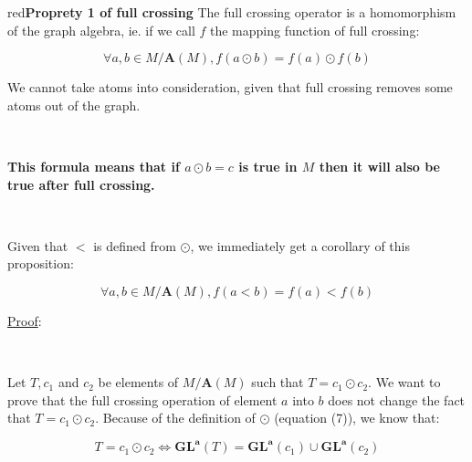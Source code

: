 \documentclass[a4paper, 11pt]{article}
\begin{document}
\begin{mybox}{red}{\textbf{Proprety 1 of full crossing}}
The full crossing operator is a homomorphism of the graph algebra, ie. if we call $f$ the mapping function of full crossing:

\begin{equation}
    \forall a,b \in M/\boldsymbol{A}(M), f(a \odot b) = f(a) \odot f(b) 
\end{equation}

We cannot take atoms into consideration, given that full crossing removes some atoms out of the graph.


\

\textbf{This formula means that if $a \odot b = c$ is true in $M$ then it will also be true after full crossing.}

\

Given that $<$ is defined from $\odot$, we immediately get a corollary of this proposition:

\begin{equation}
    \forall a,b \in M/\boldsymbol{A}(M), f(a < b) = f(a) < f(b) 
\end{equation}


\end{mybox}

\noindent
\underline{Proof}:

\

Let $T, c_1$ and $c_2$ be elements of $M/\boldsymbol{A}(M)$ such that $T = c_1 \odot c_2$. We want to prove that the full crossing operation of element $a$ into $b$ does not change the fact that $T = c_1 \odot c_2$. Because of the definition of $\odot$ (equation (7)), we know that:

\begin{equation*}
    T = c_1 \odot c_2 \Leftrightarrow \boldsymbol{GL}^{\boldsymbol{a}}(T) = \boldsymbol{GL}^{\boldsymbol{a}}(c_1) \cup \boldsymbol{GL}^{\boldsymbol{a}}(c_2)
\end{equation*}

\begin{center}
\end{center}
\end{document}
